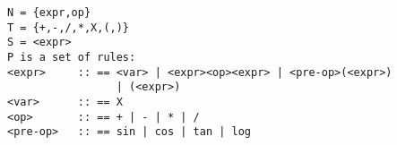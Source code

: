 \begin{verbatim}
N = {expr,op}
T = {+,-,/,*,X,(,)}
S = <expr>
P is a set of rules:
<expr>     :: == <var> | <expr><op><expr> | <pre-op>(<expr>)
                 | (<expr>) 
<var>      :: == X  	                                           
<op>       :: == + | - | * | /                            
<pre-op>   :: == sin | cos | tan | log        

\end{verbatim}
